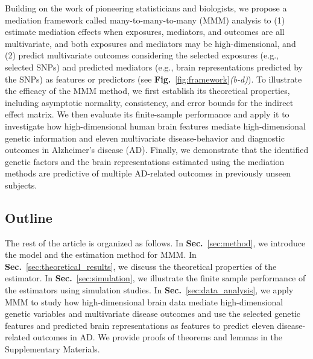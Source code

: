 \documentclass[
  12pt]{article}
\def\M{\mathbf{m}}
\def\X{\mathbf{x}}
\def\Y{\mathbf{y}}
\begin{document}
Building on the work of pioneering statisticians and biologists, we propose a mediation framework called many-to-many-to-many (MMM) analysis to (1) estimate mediation effects when exposures, mediators, and outcomes are all multivariate, and both exposures and mediators may be high-dimensional, and (2) predict multivariate outcomes considering the selected exposures (e.g., selected SNPs) and predicted mediators (e.g., brain representations predicted by the SNPs) as features or predictors (see \textbf{Fig.}~\ref{fig:framework}\textit{(b-d)}). To illustrate the efficacy of the MMM method, we first establish its theoretical properties, including asymptotic normality, consistency, and error bounds for the indirect effect matrix. We then evaluate its finite-sample performance and apply it to investigate how high-dimensional human brain features mediate high-dimensional genetic information and eleven multivariate disease-behavior and diagnostic outcomes in Alzheimer's disease (AD). Finally, we demonstrate that the identified genetic factors and the brain representations estimated using the mediation methods are predictive of multiple AD-related outcomes in previously unseen subjects.

\subsection{Outline}


The rest of the article is organized as follows.
In \textbf{Sec.}~\ref{sec:method}, we introduce
the model and the estimation method for MMM.
In \textbf{Sec.}~\ref{sec:theoretical_results}, we discuss the theoretical properties of the estimator.
In \textbf{Sec.}~\ref{sec:simulation}, we illustrate the finite sample performance of the estimators using simulation studies.
In \textbf{Sec.}~\ref{sec:data_analysis}, we apply MMM
to study how high-dimensional brain data mediate high-dimensional genetic variables and multivariate disease outcomes and use the selected genetic features and predicted brain representations as features to predict eleven disease-related outcomes in AD.
We provide proofs of theorems and lemmas in the Supplementary Materials.





\end{document}

